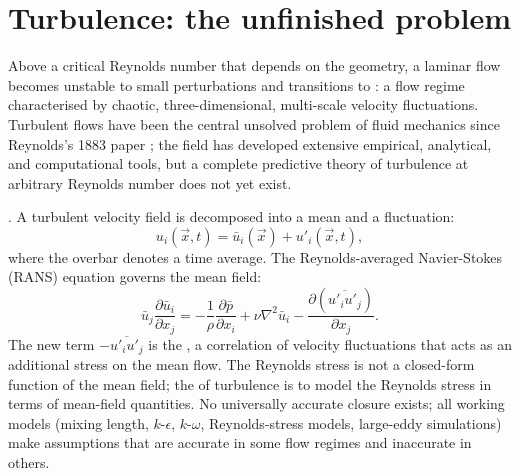 \section{Turbulence: the unfinished problem}

Above a critical Reynolds number that depends on the geometry, a
laminar flow becomes unstable to small perturbations and
transitions to : a flow regime characterised
by chaotic, three-dimensional, multi-scale velocity fluctuations.
Turbulent flows have been the central unsolved problem of fluid
mechanics since Reynolds's 1883 paper
\cite{paper:reynolds1883}; the field has developed extensive
empirical, analytical, and computational tools, but a complete
predictive theory of turbulence at arbitrary Reynolds number does
not yet exist.

. A turbulent velocity field is
decomposed into a mean and a fluctuation:
\[
u_i(\vec{x}, t) = \bar{u}_i(\vec{x}) + u'_i(\vec{x}, t),
\]
where the overbar denotes a time average. The Reynolds-averaged
Navier-Stokes (RANS) equation governs the mean field:
\[
\bar{u}_j\frac{\partial \bar{u}_i}{\partial x_j} = -\frac{1}{\rho}
\frac{\partial \bar{p}}{\partial x_i} + \nu\nabla^2 \bar{u}_i
- \frac{\partial (\overline{u'_i u'_j})}{\partial x_j}.
\]
The new term $-\overline{u'_i u'_j}$ is the , a correlation of velocity fluctuations that acts
as an additional stress on the mean flow. The Reynolds stress is
not a closed-form function of the mean field; the  of turbulence is to model the Reynolds stress in terms of
mean-field quantities. No universally accurate closure exists; all
working models (mixing length, $k$-$\epsilon$, $k$-$\omega$,
Reynolds-stress models, large-eddy simulations) make assumptions
that are accurate in some flow regimes and inaccurate in others.

